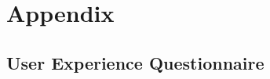 \chapter{Appendix} \label{App:AppendixB}
\renewcommand{\figurename}{Listing}

\section{User Experience Questionnaire}

